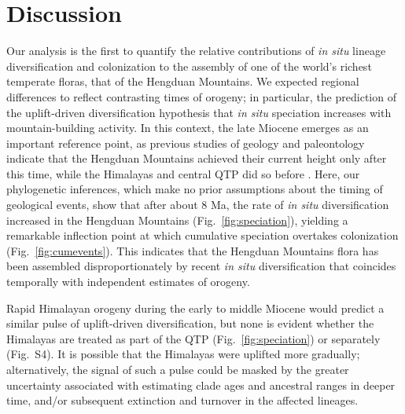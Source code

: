 \section*{Discussion}

Our analysis is the first to quantify the relative contributions of
\textit{in situ} lineage diversification and colonization to the
assembly of one of the world's richest temperate floras, that of the
Hengduan Mountains. We expected regional differences to reflect
contrasting times of orogeny; in particular, the prediction of the
uplift-driven diversification hypothesis that \textit{in situ}
speciation increases with mountain-building activity. In this context,
the late Miocene emerges as an important reference point, as previous
studies of geology and paleontology indicate that the Hengduan
Mountains achieved their current height only after this time, while
the Himalayas and central QTP did so before
\citep{WangY2012,Wang2014,Spicer2003,Favre2015,Renner2016}. Here, our
phylogenetic inferences, which make no prior assumptions about the
timing of geological events, show that after about 8 Ma, the rate of
\textit{in situ} diversification increased in the Hengduan Mountains
(Fig.~\ref{fig:speciation}), yielding a remarkable inflection point at
which cumulative speciation overtakes colonization
(Fig.~\ref{fig:cumevents}). This indicates that the Hengduan Mountains
flora has been assembled disproportionately by recent \textit{in situ}
diversification that coincides temporally with independent estimates
of orogeny.

Rapid Himalayan orogeny during the early to middle Miocene
\citep{searle2011,Spicer2003,Wang2014} would predict a similar pulse
of uplift-driven diversification, but none is evident whether the
Himalayas are treated as part of the QTP (Fig.~\ref{fig:speciation})
or separately (Fig.~S4). It is possible that the Himalayas were
uplifted more gradually; alternatively, the signal of such a pulse
could be masked by the greater uncertainty associated with estimating
clade ages and ancestral ranges in deeper time, and/or subsequent
extinction and turnover in the affected lineages.

